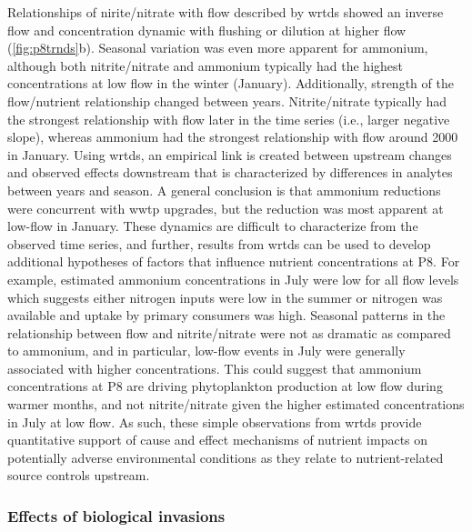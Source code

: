 \documentclass[journal = esthag, manuscript = article]{achemso}\usepackage[]{graphicx}\usepackage[]{color}
\begin{document}
Relationships of nirite/nitrate with flow described by \ac{wrtds} showed an inverse flow and concentration dynamic with flushing or dilution at higher flow (\cref{fig:p8trnds}b).  Seasonal variation was even more apparent for ammonium, although both nitrite/nitrate and ammonium typically had the highest concentrations at low flow in the winter (January).  Additionally, strength of the flow/nutrient relationship changed between years. Nitrite/nitrate typically had the strongest relationship with flow later in the time series (i.e., larger negative slope), whereas ammonium had the strongest relationship with flow around 2000 in January.  Using \ac{wrtds}, an empirical link is created between upstream changes and observed effects downstream that is characterized by differences in analytes between years and season. A general conclusion is that ammonium reductions were concurrent with \ac{wwtp} upgrades, but the reduction was most apparent at low-flow in January.  These dynamics are difficult to characterize from the observed time series, and further, results from \ac{wrtds} can be used to develop additional hypotheses of factors that influence nutrient concentrations at P8. For example, estimated ammonium concentrations in July were low for all flow levels which suggests either nitrogen inputs were low in the summer or nitrogen was available and uptake by primary consumers was high. Seasonal patterns in the relationship between flow and nitrite/nitrate were not as dramatic as compared to ammonium, and in particular, low-flow events in July were generally associated with higher concentrations.  This could suggest that ammonium concentrations at P8 are driving phytoplankton production at low flow during warmer months, and not nitrite/nitrate given the higher estimated concentrations in July at low flow. As such, these simple observations from \ac{wrtds} provide quantitative support of cause and effect mechanisms of nutrient impacts on potentially adverse environmental conditions as they relate to nutrient-related source controls upstream.

\subsubsection{Effects of biological invasions}
\end{document}
